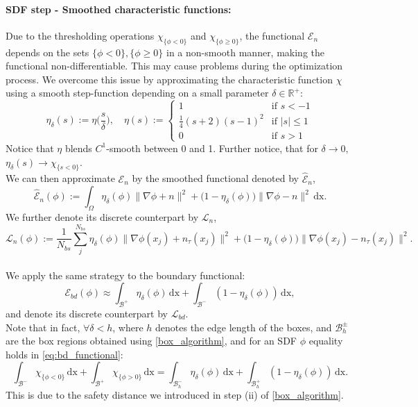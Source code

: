 \documentclass[12pt,openany]{book}
\theoremstyle{plainnormal}
\theoremstyle{remark}
\begin{document}
\paragraph{SDF step - Smoothed characteristic functions:} Due to the thresholding operations $\chi_{\{\phi<0\}}$ and $\chi_{\{\phi\geq 0\}}$, the functional $\mathcal E_n$ depends on the sets $\{\phi<0\}, \{\phi\geq0\}$ in a non-smooth manner, making the functional non-differentiable. This may cause problems during the optimization process. We overcome this issue by approximating the characteristic function $\chi$ using a smooth step-function depending on a small parameter $\delta \in \mathbb R^+$:
$$\eta_\delta(s) := \eta\Big(\frac{s}{\delta}\Big), \quad \eta(s) :=
    \begin{cases}
1 & \text{if } s < -1 \\
\frac{1}{4} (s+2)(s-1)^2 & \text{if } |s| \leq 1 \\
0 & \text{if }s > 1
\end{cases}
$$
Notice that $\eta$ blends $C^1$-smooth between 0 and 1. Further notice, that for $\delta \rightarrow 0,$ $\eta_\delta(s) \rightarrow\chi_{\{s<0\}}$.\\
We can then approximate $\mathcal E_n$ by the smoothed functional denoted by $\hat {\mathcal{E}}_n$,
$$\hat{\mathcal E}_n(\phi) := \int_\Omega \eta_\delta(\phi)\|\nabla \phi + n\|^2 + \big(1 - \eta_\delta(\phi)\big)\|\nabla \phi - n\|^2 \, \mathrm{dx}.$$
We further denote its discrete counterpart by $\mathcal{L}_n$, $$\mathcal L_n(\phi) := \frac{1}{N_{bs}}\sum_j^{N_{bs}}
\eta_\delta(\phi) \|\nabla \phi(x_j) + n_\tau(x_j)\|^2 + \big(1 - \eta_\delta(\phi)\big) \|\nabla \phi(x_j) - n_\tau(x_j)\|^2.$$\\
We apply the same strategy to the boundary functional: 
\begin{equation}\label{eq:bd_functional}
    \mathcal{E}_{bd}(\phi) \approx \int_\mathcal{B^+} \eta_\delta(\phi) \,\mathrm{dx} + \int_{\mathcal{B^-}}(1-\eta_\delta(\phi)) \,\mathrm{dx},
\end{equation}
and denote its discrete counterpart by $\mathcal{L}_{bd}$.\\
Note that in fact, $\forall \delta < h$, where $h$ denotes the edge length of the boxes, and $\mathcal{B}_h^{\pm}$ are the box regions obtained using \cref{box_algorithm}, and for an SDF $\phi$ equality holds in \cref{eq:bd_functional}:
 $$\int_{\mathcal B^-}\chi_{\{\phi < 0\}}\,\mathrm{dx} + \int_{\mathcal B^+}\chi_{\{\phi > 0\}} \,\mathrm{dx} = \int_{\mathcal{B}^{-}_h} \eta_\delta(\phi) \,\mathrm{dx} + \int_{\mathcal{B}^{+}_h}(1-\eta_\delta(\phi)) \,\mathrm{dx}.$$
This is due to the safety distance we introduced in step (ii) of \cref{box_algorithm}. 
\end{document}
